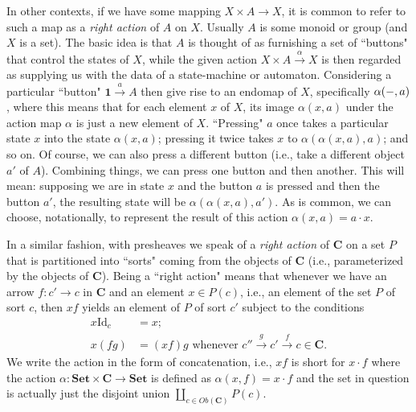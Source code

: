 \documentclass[a4paper]{book}
\theoremstyle{definition}
\theoremstyle{definition}
\theoremstyle{definition}
\theoremstyle{theorem}
\theoremstyle{definition}
\begin{document}
In other contexts, if we have some mapping $X \times A \rightarrow X$, it is common to refer to such a map as a \textit{right action} of $A$ on $X$. Usually $A$ is some monoid or group (and $X$ is a set). The basic idea is that $A$ is thought of as furnishing a set of ``buttons" that control the states of $X$, while the given action $X \times A \xrightarrow{\alpha} X$ is then regarded as supplying us with the data of a state-machine or automaton. Considering a particular ``button" $\textbf{1} \xrightarrow{a} A$ then give rise to an endomap of $X$, specifically $\alpha(\--, a)$, where this means that for each element $x$ of $X$, its image $\alpha(x, a)$ under the action map $\alpha$ is just a new element of $X$. ``Pressing" $a$ once takes a particular state $x$ into the state $\alpha(x,a)$; pressing it twice takes $x$ to $\alpha(\alpha(x,a),a)$; and so on. Of course, we can also press a different button (i.e., take a different object $a'$ of $A$). Combining things, we can press one button and then another. This will mean: supposing we are in state $x$ and the button $a$ is pressed and then the button $a'$, the resulting state will be $\alpha(\alpha(x,a), a')$. As is common, we can choose, notationally, to represent the result of this action $\alpha(x,a) = a \cdot x.$ \par    
In a similar fashion, with presheaves we speak of a \textit{right action} of \textbf{C} on a set $P$ that is partitioned into ``sorts" coming from the objects of \textbf{C} (i.e., parameterized by the objects of \textbf{C}). Being a ``right action" means that whenever we have an arrow $f: c' \rightarrow c$ in \textbf{C} and an element $x \in P(c)$, i.e., an element of the set $P$ of sort $c$, then $xf$ yields an element of $P$ of sort $c'$ subject to the conditions 
\begin{equation*}
\begin{split}
x \text{Id}_c & = x ; \\ 
x(fg) & = (xf)g \text{ whenever } c'' \xrightarrow{g} c' \xrightarrow{f} c \in \textbf{C}. 
\end{split}
\end{equation*}
We write the action in the form of concatenation, i.e., $xf$ is short for $x \cdot f$ where the action $\alpha: \textbf{Set} \times \textbf{C} \rightarrow \textbf{Set}$ is defined as $\alpha(x,f) = x \cdot f$ and the set in question is actually just the disjoint union $\amalg_{c \in Ob(\textbf{C})} P(c)$. \par 
\end{document}
